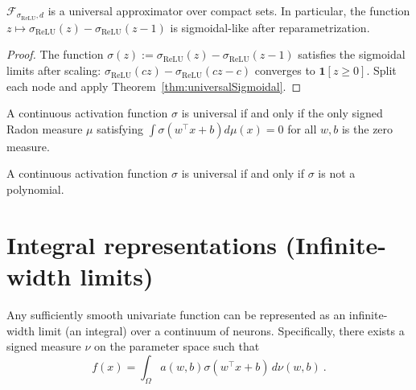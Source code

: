 \begin{corollary}\label{cor:reluUniversal}
$\mathcal{F}_{\sigma_\mathrm{ReLU},d}$ is a universal approximator over compact sets.
In particular, the function $z \mapsto \sigma_\mathrm{ReLU}(z) - \sigma_\mathrm{ReLU}(z-1)$ is sigmoidal-like after reparametrization.
\end{corollary}

\begin{proof}
  The function $\sigma(z) := \sigma_\mathrm{ReLU}(z) - \sigma_\mathrm{ReLU}(z-1)$ satisfies the sigmoidal limits after scaling: $\sigma_\mathrm{ReLU}(cz) - \sigma_\mathrm{ReLU}(cz - c)$ converges to $\mathbf{1}[z \ge 0]$.
  Split each node and apply Theorem~\ref{thm:universalSigmoidal}.
\end{proof}

\begin{corollary}\label{cor:cybenkoDuality}
A continuous activation function $\sigma$ is universal if and only if the only signed Radon measure $\mu$ satisfying $\int \sigma(w^\top x + b) d\mu(x) = 0$ for all $w,b$ is the zero measure.
\end{corollary}

\begin{corollary}\label{cor:leshnoUniversal}
A continuous activation function $\sigma$ is universal if and only if $\sigma$ is not a polynomial.
\end{corollary}

\section{Integral representations (Infinite-width limits)}\label{sec:infiniteWidth}

\begin{theorem}\label{thm:univariateIntegralRep}
Any sufficiently smooth univariate function can be represented as an infinite-width limit (an integral) over a continuum of neurons. Specifically, there exists a signed measure $\nu$ on the parameter space such that
\[
  f(x) = \int_{\Omega} a(w,b) \sigma(w^\top x + b) \, d\nu(w,b)
  \: .
\]
\end{theorem}

